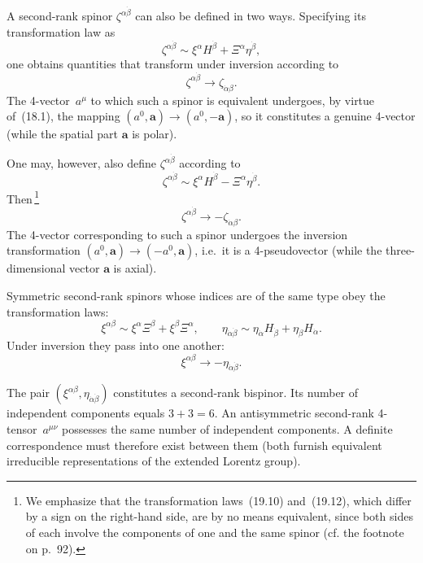 A second-rank spinor $\zeta^{\alpha\dot\beta}$ can also be defined in two ways. Specifying its transformation law as
\begin{equation}
\zeta^{\alpha\dot\beta} \sim \xi^\alpha H^{\dot\beta} + \Xi^\alpha\eta^{\dot\beta},
\tag{19.9}
\end{equation}
one obtains quantities that transform under inversion according to
\begin{equation}
\zeta^{\alpha\dot\beta} \to \zeta_{\dot\alpha\beta}.
\tag{19.10}
\end{equation}
The 4-vector~$a^\mu$ to which such a spinor is equivalent undergoes, by virtue of~(18.1), the mapping $(a^0, \mathbf{a}) \to (a^0, -\mathbf{a})$, so it constitutes a genuine 4-vector (while the spatial part $\mathbf{a}$ is polar).

One may, however, also define $\zeta^{\alpha\dot\beta}$ according to
\begin{equation}
\zeta^{\alpha\dot\beta} \sim \xi^\alpha H^{\dot\beta} - \Xi^\alpha\eta^{\dot\beta}.
\tag{19.11}
\end{equation}
Then\,\footnote{We emphasize that the transformation laws~(19.10) and~(19.12), which differ by a sign on the right-hand side, are by no means equivalent, since both sides of each involve the components of one and the same spinor (cf. the footnote on p.~92).}
\begin{equation}
\zeta^{\alpha\dot\beta} \to -\zeta_{\dot\alpha\beta}.
\tag{19.12}
\end{equation}
The 4-vector corresponding to such a spinor undergoes the inversion transformation $(a^0, \mathbf{a}) \to (-a^0, \mathbf{a})$, i.e.\ it is a 4-pseudovector (while the three-dimensional vector $\mathbf{a}$ is axial).

Symmetric second-rank spinors whose indices are of the same type obey the transformation laws:
\begin{equation}
\xi^{\alpha\beta} \sim \xi^\alpha\Xi^\beta + \xi^\beta\Xi^\alpha,\qquad \eta_{\dot\alpha\dot\beta} \sim \eta_{\dot\alpha}H_{\dot\beta} + \eta_{\dot\beta}H_{\dot\alpha}.
\tag{19.13}
\end{equation}
Under inversion they pass into one another:
\begin{equation}
\xi^{\alpha\beta} \to -\eta_{\dot\alpha\dot\beta}.
\tag{19.14}
\end{equation}

The pair $(\xi^{\alpha\beta}, \eta_{\dot\alpha\dot\beta})$ constitutes a second-rank bispinor. Its number of independent components equals $3+3 = 6$. An antisymmetric second-rank 4-tensor~$a^{\mu\nu}$ possesses the same number of independent components. A definite correspondence must therefore exist between them (both furnish equivalent irreducible representations of the extended Lorentz group).

